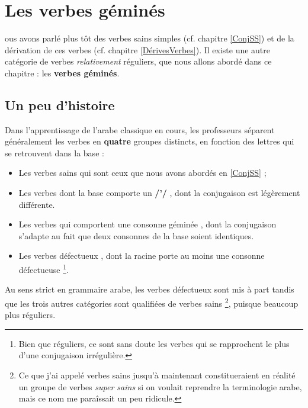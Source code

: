 \chapter{Les verbes géminés}\label{VerbesGéminés}
ous avons parlé plus tôt des verbes sains simples (cf. chapitre \ref{ConjSS}) et de la dérivation de ces verbes (cf. chapitre \ref{DérivesVerbes}). Il existe une autre catégorie de verbes \textit{relativement} réguliers, que nous allons abordé dans ce chapitre : les \textbf{verbes géminés}.


\section{Un peu d'histoire}
Dans l'apprentissage de l'arabe classique en cours, les professeurs séparent généralement les verbes en \textbf{quatre} groupes distincts, en fonction des lettres qui se retrouvent dans la base : 

\begin{itemize}
    \item Les verbes sains  qui sont ceux que nous avons abordés en \ref{ConjSS} ; 
    \item Les verbes dont la base comporte un \textbf{/'/} , dont la conjugaison est légèrement différente. 
    \item Les verbes qui comportent une consonne géminée , dont la conjugaison s'adapte au fait que deux consonnes de la base soient identiques.
    \item Les verbes défectueux , dont la racine porte au moins une consonne défectueuse \footnote{Bien que réguliers, ce sont sans doute les verbes qui se rapprochent le plus d'une conjugaison irrégulière.}. 
\end{itemize}

Au sens strict en grammaire arabe, les verbes défectueux sont mis à part tandis que les trois autres catégories sont qualifiées de verbes sains \footnote{Ce que j'ai appelé verbes sains jusqu'à maintenant constitueraient en réalité un groupe de verbes \textit{super sains} si on voulait reprendre la terminologie arabe, mais ce nom me paraîssait un peu ridicule.}, puisque beaucoup plus réguliers.

